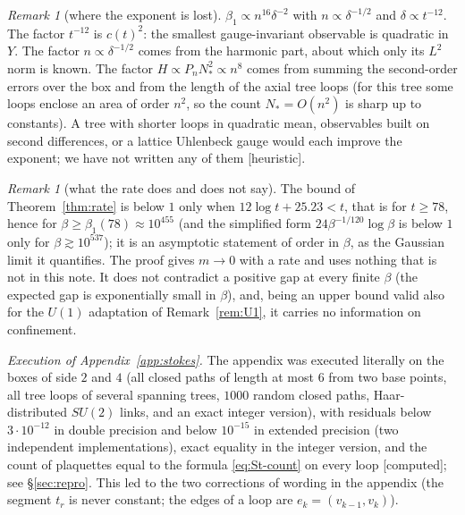 \documentclass[11pt,a4paper]{article}
\theoremstyle{plain}
\theoremstyle{definition}
\theoremstyle{remark}
\newtheorem{remark}[theorem]{Remark}
\numberwithin{equation}{section}
\newcommand{\st}[1]{\textsf{[#1]}}
\begin{document}
\begin{remark}[where the exponent is lost]\label{rem:exponent}
$\beta_1\propto n^{16}\delta^{-2}$ with $n\propto\delta^{-1/2}$ and $\delta\propto t^{-12}$. The factor $t^{-12}$ is $c(t)^2$: the smallest
gauge-invariant observable is quadratic in $Y$. The factor $n\propto\delta^{-1/2}$ comes from the harmonic part, about which only its
$L^2$ norm is known. The factor $H\propto P_nN_*^2\propto n^8$ comes from summing the second-order errors over the box and from the length
of the axial tree loops (for this tree some loops enclose an area of order $n^2$, so the count $N_*=O(n^2)$ is sharp up to constants).
A tree with shorter loops in quadratic mean, observables built on second differences, or a lattice Uhlenbeck gauge
would each improve the exponent; we have not written any of them \st{heuristic}.
\end{remark}


\begin{remark}[what the rate does and does not say]
The bound of Theorem~\ref{thm:rate} is below $1$ only when $12\log t+25.23<t$, that is for $t\ge78$, hence for $\beta\ge\beta_1(78)\approx10^{455}$ (and the simplified form $24\beta^{-1/120}\log\beta$ is below $1$ only for $\beta\gtrsim10^{537}$); it is an asymptotic
statement of order in $\beta$, as the Gaussian limit it quantifies. The proof gives $m\to0$ with a rate and uses nothing that is not in this note. It does not contradict a positive gap at
every finite $\beta$ (the expected gap is exponentially small in $\beta$), and, being an upper bound valid also for the $U(1)$ adaptation of Remark~\ref{rem:U1}, it carries no information on confinement.
\end{remark}
\emph{Execution of Appendix~\ref{app:stokes}.} The appendix was executed literally on the boxes of side $2$ and $4$ (all closed paths of length at most $6$ from two base points, all tree loops of several spanning trees,
$1000$ random closed paths, Haar-distributed $SU(2)$ links, and an exact integer version), with residuals below $3\cdot10^{-12}$ in double precision and below $10^{-15}$ in extended precision (two independent implementations), exact equality in the integer version, and the count of
plaquettes equal to the formula \eqref{eq:St-count} on every loop \st{computed}; see \S\ref{sec:repro}. This led to the two corrections of wording in the appendix (the segment $t_r$ is never constant; the edges of a loop are $e_k=(v_{k-1},v_k)$).


\end{document}
